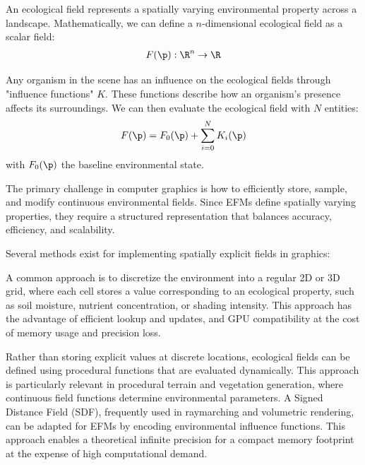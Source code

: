 An ecological field represents a spatially varying environmental property across a landscape. Mathematically, we can define a $n$-dimensional ecological field as a scalar field:
\begin{align}
    F(\p) : \R^n \to \R
\end{align}

Any organism in the scene has an influence on the ecological fields through "influence functions" $K$. These functions describe how an organism's presence affects its surroundings. We can then evaluate the ecological field with $N$ entities:
\begin{align}
    \label{eq:env-obj-eco-field-computation}
    F(\p) = F_0(\p) + \sum_{i=0}^{N}{K_i(\p)} 
\end{align}
with $F_0(\p)$ the baseline environmental state.




The primary challenge in computer graphics is how to efficiently store, sample, and modify continuous environmental fields. Since EFMs define spatially varying properties, they require a structured representation that balances accuracy, efficiency, and scalability.

Several methods exist for implementing spatially explicit fields in graphics:
\begin{Itemize}
    \Item{} A common approach is to discretize the environment into a regular 2D or 3D grid, where each cell stores a value corresponding to an ecological property, such as soil moisture, nutrient concentration, or shading intensity. This approach has the advantage of efficient lookup and updates, and GPU compatibility at the cost of memory usage and precision loss. 

    \Item{} Rather than storing explicit values at discrete locations, ecological fields can be defined using procedural functions that are evaluated dynamically. This approach is particularly relevant in procedural terrain and vegetation generation, where continuous field functions determine environmental parameters. A Signed Distance Field (SDF), frequently used in raymarching and volumetric rendering, can be adapted for EFMs by encoding environmental influence functions. This approach enables a theoretical infinite precision for a compact memory footprint at the expense of high computational demand.
\end{Itemize}


